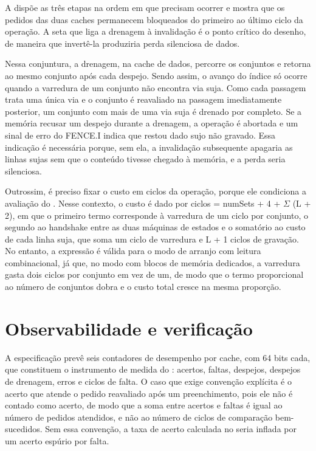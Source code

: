 A  dispõe as três etapas na ordem em que precisam ocorrer e mostra que os pedidos das duas caches permanecem bloqueados do primeiro ao último ciclo da operação. A seta que liga a drenagem à invalidação é o ponto crítico do desenho, de maneira que invertê-la produziria perda silenciosa de dados.


Nessa conjuntura, a drenagem, na cache de dados, percorre os conjuntos e retorna ao mesmo conjunto após cada despejo. Sendo assim, o avanço do índice só ocorre quando a varredura de um conjunto não encontra via suja. Como cada passagem trata uma única via e o conjunto é reavaliado na passagem imediatamente posterior, um conjunto com mais de uma via suja é drenado por completo. Se a memória recusar um despejo durante a drenagem, a operação é abortada e um sinal de erro do FENCE.I indica que restou dado sujo não gravado. Essa indicação é necessária porque, sem ela, a invalidação subsequente apagaria as linhas sujas sem que o conteúdo tivesse chegado à memória, e a perda seria silenciosa.

Outrossim, é preciso fixar o custo em ciclos da operação, porque ele condiciona a avaliação do . Nesse contexto, o custo é dado por ciclos = numSets + 4 + $\Sigma$ (L + 2), em que o primeiro termo corresponde à varredura de um ciclo por conjunto, o segundo ao handshake entre as duas máquinas de estados e o somatório ao custo de cada linha suja, que soma um ciclo de varredura e L + 1 ciclos de gravação. No entanto, a expressão é válida para o modo de arranjo com leitura combinacional, já que, no modo com blocos de memória dedicados, a varredura gasta dois ciclos por conjunto em vez de um, de modo que o termo proporcional ao número de conjuntos dobra e o custo total cresce na mesma proporção.

\section{Observabilidade e verificação}\label{sec:3.10}

A especificação prevê seis contadores de desempenho por cache, com 64 bits cada, que constituem o instrumento de medida do : acertos, faltas, despejos, despejos de drenagem, erros e ciclos de falta. O caso que exige convenção explícita é o acerto que atende o pedido reavaliado após um preenchimento, pois ele não é contado como acerto, de modo que a soma entre acertos e faltas é igual ao número de pedidos atendidos, e não ao número de ciclos de comparação bem-sucedidos. Sem essa convenção, a taxa de acerto calculada no  seria inflada por um acerto espúrio por falta.

